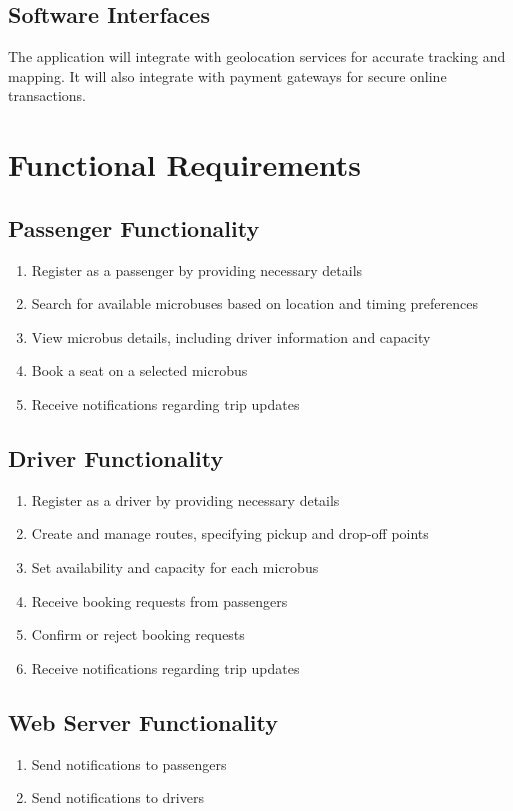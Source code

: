 \documentclass{BusMateSRS}
\begin{document}
\subsection{Software Interfaces}
The application will integrate with geolocation services for accurate tracking 
and mapping. It will also integrate with payment gateways for secure online 
transactions.

\section{Functional Requirements}
\subsection{Passenger Functionality}
\begin{enumerate}
  \item Register as a passenger by providing necessary details
  \item Search for available microbuses based on location and timing preferences
  \item View microbus details, including driver information and capacity
  \item Book a seat on a selected microbus
  \item Receive notifications regarding trip updates
\end{enumerate}

\subsection{Driver Functionality}
\begin{enumerate}
  \item Register as a driver by providing necessary details
  \item Create and manage routes, specifying pickup and drop-off points
  \item Set availability and capacity for each microbus
  \item Receive booking requests from passengers
  \item Confirm or reject booking requests
  \item Receive notifications regarding trip updates
\end{enumerate}

\subsection{Web Server Functionality}
\begin{enumerate}
  \item Send notifications to passengers
  \item Send notifications to drivers 
\end{enumerate}
\end{document}
